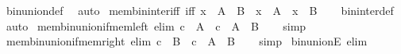 \begin{isabellebody}
\ bin{\isacharunderscore}{\kern0pt}union{\isacharunderscore}{\kern0pt}def\ \isamarkupfalse%
\ auto%
\endisatagproof
{\isafoldproof}%
%
\isadelimproof
\isanewline
%
\endisadelimproof
\isanewline
{}\isamarkupfalse%
\ mem{\isacharunderscore}{\kern0pt}bin{\isacharunderscore}{\kern0pt}inter{\isacharunderscore}{\kern0pt}iff\ {\isacharbrackleft}{\kern0pt}iff{\isacharbrackright}{\kern0pt}{\isacharcolon}{\kern0pt}\ {\isachardoublequoteopen}x\ {\isasymin}\ A\ {\isasyminter}\ B\ {\isasymlongleftrightarrow}\ x\ {\isasymin}\ A\ {\isasymand}\ x\ {\isasymin}\ B{\isachardoublequoteclose}\isanewline
%
\isadelimproof
\ \ %
\endisadelimproof
%
\isatagproof
{}\isamarkupfalse%
\ bin{\isacharunderscore}{\kern0pt}inter{\isacharunderscore}{\kern0pt}def\ \isamarkupfalse%
\ auto%
\endisatagproof
{\isafoldproof}%
%
\isadelimproof
%
\endisadelimproof
%
\isadelimdocument
%
\endisadelimdocument
%
\isatagdocument
%
\isamarkuptrue%
%
\endisatagdocument
{\isafolddocument}%
%
\isadelimdocument
%
\endisadelimdocument
{}\isamarkupfalse%
\ mem{\isacharunderscore}{\kern0pt}bin{\isacharunderscore}{\kern0pt}union{\isacharunderscore}{\kern0pt}if{\isacharunderscore}{\kern0pt}mem{\isacharunderscore}{\kern0pt}left\ {\isacharbrackleft}{\kern0pt}elim{\isacharquery}{\kern0pt}{\isacharbrackright}{\kern0pt}{\isacharcolon}{\kern0pt}\ {\isachardoublequoteopen}c\ {\isasymin}\ A\ {\isasymLongrightarrow}\ c\ {\isasymin}\ A\ {\isasymunion}\ B{\isachardoublequoteclose}\isanewline
%
\isadelimproof
\ \ %
\endisadelimproof
%
\isatagproof
{}\isamarkupfalse%
\ simp%
\endisatagproof
{\isafoldproof}%
%
\isadelimproof
\isanewline
%
\endisadelimproof
\isanewline
{}\isamarkupfalse%
\ mem{\isacharunderscore}{\kern0pt}bin{\isacharunderscore}{\kern0pt}union{\isacharunderscore}{\kern0pt}if{\isacharunderscore}{\kern0pt}mem{\isacharunderscore}{\kern0pt}right\ {\isacharbrackleft}{\kern0pt}elim{\isacharquery}{\kern0pt}{\isacharbrackright}{\kern0pt}{\isacharcolon}{\kern0pt}\ {\isachardoublequoteopen}c\ {\isasymin}\ B\ {\isasymLongrightarrow}\ c\ {\isasymin}\ A\ {\isasymunion}\ B{\isachardoublequoteclose}\isanewline
%
\isadelimproof
\ \ %
\endisadelimproof
%
\isatagproof
{}\isamarkupfalse%
\ simp%
\endisatagproof
{\isafoldproof}%
%
\isadelimproof
\isanewline
%
\endisadelimproof
\isanewline
{}\isamarkupfalse%
\ bin{\isacharunderscore}{\kern0pt}unionE\ {\isacharbrackleft}{\kern0pt}elim{\isacharbang}{\kern0pt}{\isacharbrackright}{\kern0pt}{\isacharcolon}{\kern0pt}\isanewline

\end{isabellebody}
